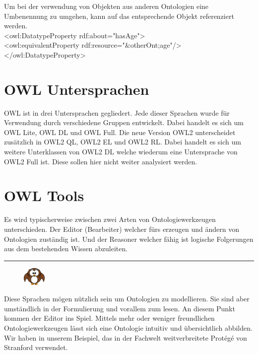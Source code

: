 Um bei der verwendung von Objekten aus anderen Ontologien eine Umbenennung zu umgehen, kann auf das entsprechende Objekt referenziert werden.\\

 \noindent\hspace*{15mm}<owl:DatatypeProperty rdf:about="hasAge">\\
 \noindent\hspace*{25mm}  <owl:equivalentProperty rdf:resource="\&otherOnt;age"/>\\
 \noindent\hspace*{15mm}</owl:DatatypeProperty>\\

\section{OWL Untersprachen}
\label{sec:owl_owl_Untersprachen}
OWL ist in drei Untersprachen gegliedert. Jede dieser Sprachen wurde für Verwendung durch verschiedene Gruppen entwickelt. Dabei handelt es sich um OWL Lite, OWL DL und OWL Full. Die neue Version OWL2 unterscheidet zusätzlich in OWL2 QL, OWL2 EL und OWL2 RL. Dabei handelt es sich um weitere Unterklassen von OWL2 DL welche wiederum eine Untersprache von OWL2 Full ist. Diese sollen hier nicht weiter analysiert werden.

\section{OWL Tools}
\label{sec:owl_owl_OwlTools}


Es wird typischerweise zwischen zwei Arten von Ontologiewerkzeugen unterschieden. Der Editor (Bearbeiter) welcher fürs erzeugen und ändern von Ontologien zuständig ist. Und der Reasoner welcher fähig ist logische Folgerungen aus dem bestehenden Wissen abzuleiten.

\noindent\rule[1ex]{\textwidth}{1pt}
\vspace{0.1pt}
\begin{figure}
    \vspace{-19pt}
    \includegraphics[width=0.1\textwidth]{bilder/owl.png}
\end{figure}
Diese Sprachen mögen nützlich sein um Ontologien zu modellieren. Sie sind aber umständlich in der Formulierung und vorallem zum lesen. An diesem Punkt kommen der Editor ins Spiel. Mittels mehr oder weniger freundlichen Ontologiewerkzeugen lässt sich eine Ontologie intuitiv und übersichtlich abbilden. Wir haben in unserem Beispiel, das in der Fachwelt weitverbreitete Protégé von Stranford verwendet.


